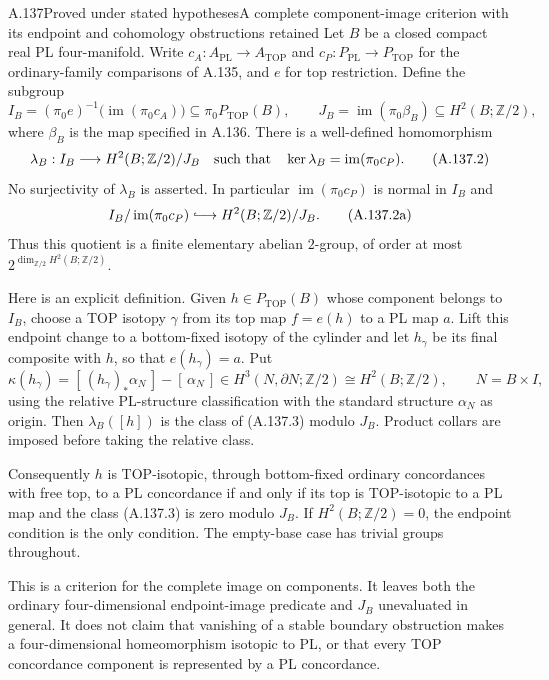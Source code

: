 \begin{saresult}{A.137}{Proved under stated hypotheses}{A complete component-image criterion with its endpoint and cohomology obstructions retained}
Let $B$ be a closed compact real PL four-manifold. Write
$c_A:A_{\mathrm{PL}}\to A_{\mathrm{TOP}}$ and
$c_P:P_{\mathrm{PL}}\to P_{\mathrm{TOP}}$ for the ordinary-family
comparisons of A.135, and $e$ for top restriction. Define the subgroup
\[
 I_B=(\pi_0e)^{-1}
       \bigl(\operatorname{im}(\pi_0c_A)\bigr)
       \subseteq\pi_0P_{\mathrm{TOP}}(B),
 \qquad
 J_B=\operatorname{im}(\pi_0\beta_B)
       \subseteq H^2(B;\mathbb Z/2),                    \tag{A.137.1}
\]
where $\beta_B$ is the map specified in A.136. There is a
well-defined homomorphism
\[
 \lambda_B:I_B\longrightarrow H^2(B;\mathbb Z/2)/J_B
 \quad\hbox{such that}\quad
 \ker\lambda_B=\operatorname{im}(\pi_0c_P).             \tag{A.137.2}
\]
No surjectivity of $\lambda_B$ is asserted.
In particular $\operatorname{im}(\pi_0c_P)$ is normal in $I_B$ and
\[
 I_B/\operatorname{im}(\pi_0c_P)
     \lhook\joinrel\longrightarrow H^2(B;\mathbb Z/2)/J_B.
                                                               \tag{A.137.2a}
\]
Thus this quotient is a finite elementary abelian $2$-group, of
order at most $2^{\dim_{\mathbb Z/2}H^2(B;\mathbb Z/2)}$.

Here is an explicit definition. Given $h\in P_{\mathrm{TOP}}(B)$
whose component belongs to $I_B$, choose a TOP isotopy $\gamma$
from its top map $f=e(h)$ to a PL map $a$. Lift this endpoint change
to a bottom-fixed isotopy of the cylinder and let $h_\gamma$ be its
final composite with $h$, so that $e(h_\gamma)=a$. Put
\[
 \kappa(h_\gamma)
   =[\,(h_\gamma)_*\alpha_N\,]-[\,\alpha_N\,]
   \in H^3(N,\partial N;\mathbb Z/2)
   \cong H^2(B;\mathbb Z/2),\qquad N=B\times I,         \tag{A.137.3}
\]
using the relative PL-structure classification with the standard
structure $\alpha_N$ as origin. Then
$\lambda_B([h])$ is the class of (A.137.3) modulo $J_B$.
Product collars are imposed before taking the relative class.

Consequently $h$ is TOP-isotopic, through bottom-fixed ordinary
concordances with free top, to a PL concordance if and only if its top
is TOP-isotopic to a PL map and the class (A.137.3) is zero modulo
$J_B$. If $H^2(B;\mathbb Z/2)=0$, the endpoint condition is the only
condition. The empty-base case has trivial groups throughout.

This is a criterion for the complete image on components. It leaves
both the ordinary four-dimensional endpoint-image predicate and
$J_B$ unevaluated in general. It does not claim that vanishing of a
stable boundary obstruction makes a four-dimensional homeomorphism
isotopic to PL, or that every TOP concordance component is represented
by a PL concordance.
\end{saresult}
